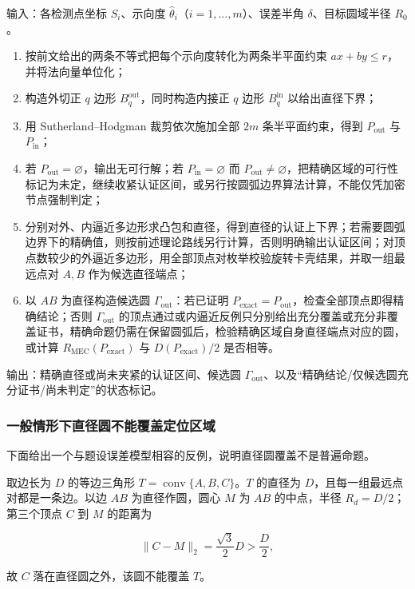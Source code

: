 输入：各检测点坐标 $S_i$、示向度 $\hat\theta_i$（$i=1,\ldots,m$）、误差半角 $\delta$、目标圆域半径 $R_0$。

\begin{enumerate}
\item 按前文给出的两条不等式把每个示向度转化为两条半平面约束 $ax+by\le r$，并将法向量单位化；
\item 构造外切正 $q$ 边形 $B_q^{\mathrm{out}}$，同时构造内接正 $q$ 边形 $B_q^{\mathrm{in}}$ 以给出直径下界；
\item 用 Sutherland–Hodgman 裁剪依次施加全部 $2m$ 条半平面约束，得到 $P_{\mathrm{out}}$ 与 $P_{\mathrm{in}}$；
\item 若 $P_{\mathrm{out}}=\varnothing$，输出无可行解；若 $P_{\mathrm{in}}=\varnothing$ 而 $P_{\mathrm{out}}\ne\varnothing$，把精确区域的可行性标记为未定，继续收紧认证区间，或另行按圆弧边界算法计算，不能仅凭加密节点强制判定；
\item 分别对外、内逼近多边形求凸包和直径，得到直径的认证上下界；若需要圆弧边界下的精确值，则按前述理论路线另行计算，否则明确输出认证区间；对顶点数较少的外逼近多边形，用全部顶点对枚举校验旋转卡壳结果，并取一组最远点对 $A,B$ 作为候选直径端点；
\item 以 $AB$ 为直径构造候选圆 $\Gamma_{\mathrm{out}}$：若已证明 $P_{\mathrm{exact}}=P_{\mathrm{out}}$，检查全部顶点即得精确结论；否则 $\Gamma_{\mathrm{out}}$ 的顶点通过或内逼近反例只分别给出充分覆盖或充分非覆盖证书，精确命题仍需在保留圆弧后，检验精确区域自身直径端点对应的圆，或计算 $R_{\mathrm{MEC}}(P_{\mathrm{exact}})$ 与 $D(P_{\mathrm{exact}})/2$ 是否相等。
\end{enumerate}

输出：精确直径或尚未夹紧的认证区间、候选圆 $\Gamma_{\mathrm{out}}$、以及“精确结论/仅候选圆充分证书/尚未判定”的状态标记。

\subsubsection{一般情形下直径圆不能覆盖定位区域}

下面给出一个与题设误差模型相容的反例，说明直径圆覆盖不是普遍命题。

取边长为 $D$ 的等边三角形 $T=\operatorname{conv}\{A,B,C\}$。$T$ 的直径为 $D$，且每一组最远点对都是一条边。以边 $AB$ 为直径作圆，圆心 $M$ 为 $AB$ 的中点，半径 $R_d=D/2$；第三个顶点 $C$ 到 $M$ 的距离为

\[
\lVert C-M\rVert_2=\frac{\sqrt3}{2}D>\frac{D}{2},
\]

故 $C$ 落在直径圆之外，该圆不能覆盖 $T$。

